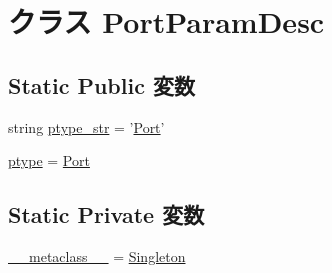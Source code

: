 \hypertarget{classm5_1_1params_1_1PortParamDesc}{
\section{クラス PortParamDesc}
\label{classm5_1_1params_1_1PortParamDesc}
}
\subsection*{Static Public 変数}
\begin{DoxyCompactItemize}
\item 
string \hyperlink{classm5_1_1params_1_1PortParamDesc_a29e0f56ac0f7569c2c0a3996f05d4b7f}{ptype\_\-str} = '\hyperlink{classm5_1_1params_1_1Port}{Port}'
\item 
\hyperlink{classm5_1_1params_1_1PortParamDesc_a0916607956575302a93dbd21440edc1a}{ptype} = \hyperlink{classm5_1_1params_1_1Port}{Port}
\end{DoxyCompactItemize}
\subsection*{Static Private 変数}
\begin{DoxyCompactItemize}
\item 
\hyperlink{classm5_1_1params_1_1PortParamDesc_adfc4d1824f4ecdcbb04ceafc5bbc933e}{\_\-\_\-metaclass\_\-\_\-} = \hyperlink{classm5_1_1util_1_1Singleton}{Singleton}
\end{DoxyCompactItemize}


